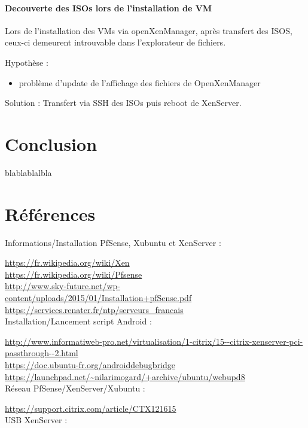 \documentclass[a4paper,12pt]{extarticle}
\begin{document}
\paragraph{Decouverte des ISOs lors de l'installation de VM\\}
Lors de l'installation des VMs via openXenManager, après transfert des ISOS, ceux-ci demeurent introuvable dans l'explorateur de fichiers.

Hypothèse :
\begin{itemize}
\item problème d'update de l'affichage des fichiers de OpenXenManager\\
\end{itemize}

Solution :
Transfert via SSH des ISOs puis reboot de XenServer.

\clearpage

\section{Conclusion}
blablablalbla

\section{Références}

Informations/Installation PfSense, Xubuntu et XenServer :

\url{https://fr.wikipedia.org/wiki/Xen}\\
\url{https://fr.wikipedia.org/wiki/Pfsense}\\
\url{http://www.sky-future.net/wp-content/uploads/2015/01/Installation+pfSense.pdf}\\
\url{https://services.renater.fr/ntp/serveurs_francais}\\

Installation/Lancement script Android :

\url{http://www.informatiweb-pro.net/virtualisation/1-citrix/15--citrix-xenserver-pci-passthrough--2.html}\\
\url{https://doc.ubuntu-fr.org/androiddebugbridge}\\
\url{https://launchpad.net/~nilarimogard/+archive/ubuntu/webupd8}\\

Réseau PfSense/XenServer/Xubuntu :

\url{https://support.citrix.com/article/CTX121615}\\

USB XenServer :
\end{document}
